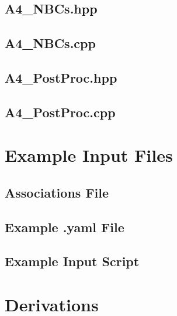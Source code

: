 \documentclass[a4paper, 12pt]{article}
\begin{document}
\subsection{A4\_NBCs.hpp} \label{subsec:NBCs.hpp}


\subsection{A4\_NBCs.cpp} \label{subsec:NBCs.cpp}


\subsection{A4\_PostProc.hpp} \label{subsec:PostProc.hpp}


\subsection{A4\_PostProc.cpp} \label{subsec:PostProc.cpp}


\newpage
\section{Example Input Files}\label{sec:ExInput}

\subsection{Associations File} \label{subsec:ExAssoc}


\subsection{Example .yaml File} \label{subsec:ExYaml}


\subsection{Example Input Script} \label{subsec:ExIn}


\newpage
\section{Derivations} \label{sec:Derivations}
\end{document}
